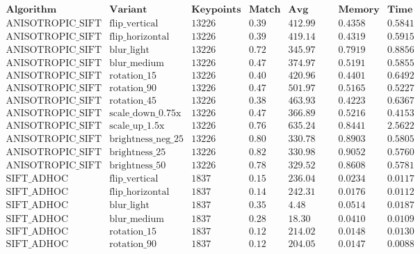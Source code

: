 \documentclass[conference]{IEEEtran}
\begin{document}
$$\begin{array}{|l|l|c|c|c|c|c|}
\hline
\textbf{Algorithm} & \textbf{Variant} & \textbf{Keypoints} & \textbf{Match Ratio} & \textbf{Avg Distance} & \textbf{Memory (MB)} & \textbf{Time (hrs)} \\ \hline
\text{ANISOTROPIC\_SIFT} & \text{flip\_vertical} & 13226 & 0.39 & 412.99 & 0.4358 & 0.5841 \\
\text{ANISOTROPIC\_SIFT} & \text{flip\_horizontal} & 13226 & 0.39 & 419.14 & 0.4319 & 0.5915 \\
\text{ANISOTROPIC\_SIFT} & \text{blur\_light} & 13226 & 0.72 & 345.97 & 0.7919 & 0.8856 \\
\text{ANISOTROPIC\_SIFT} & \text{blur\_medium} & 13226 & 0.47 & 374.97 & 0.5191 & 0.5855 \\
\text{ANISOTROPIC\_SIFT} & \text{rotation\_15} & 13226 & 0.40 & 420.96 & 0.4401 & 0.6492 \\
\text{ANISOTROPIC\_SIFT} & \text{rotation\_90} & 13226 & 0.47 & 501.97 & 0.5165 & 0.5227 \\
\text{ANISOTROPIC\_SIFT} & \text{rotation\_45} & 13226 & 0.38 & 463.93 & 0.4223 & 0.6367 \\
\text{ANISOTROPIC\_SIFT} & \text{scale\_down\_0.75x} & 13226 & 0.47 & 366.89 & 0.5216 & 0.4153 \\
\text{ANISOTROPIC\_SIFT} & \text{scale\_up\_1.5x} & 13226 & 0.76 & 635.24 & 0.8441 & 2.5622 \\
\text{ANISOTROPIC\_SIFT} & \text{brightness\_neg\_25} & 13226 & 0.80 & 330.78 & 0.8903 & 0.5805 \\
\text{ANISOTROPIC\_SIFT} & \text{brightness\_25} & 13226 & 0.82 & 330.98 & 0.9052 & 0.5760 \\
\text{ANISOTROPIC\_SIFT} & \text{brightness\_50} & 13226 & 0.78 & 329.52 & 0.8608 & 0.5781 \\ \hline
\text{SIFT\_ADHOC} & \text{flip\_vertical} & 1837 & 0.15 & 236.04 & 0.0234 & 0.0117 \\
\text{SIFT\_ADHOC} & \text{flip\_horizontal} & 1837 & 0.14 & 242.31 & 0.0176 & 0.0112 \\
\text{SIFT\_ADHOC} & \text{blur\_light} & 1837 & 0.35 & 4.48 & 0.0514 & 0.0187 \\
\text{SIFT\_ADHOC} & \text{blur\_medium} & 1837 & 0.28 & 18.30 & 0.0410 & 0.0109 \\
\text{SIFT\_ADHOC} & \text{rotation\_15} & 1837 & 0.12 & 214.02 & 0.0148 & 0.0130 \\
\text{SIFT\_ADHOC} & \text{rotation\_90} & 1837 & 0.12 & 204.05 & 0.0147 & 0.0088 \\

\end{array}$$
\end{document}
